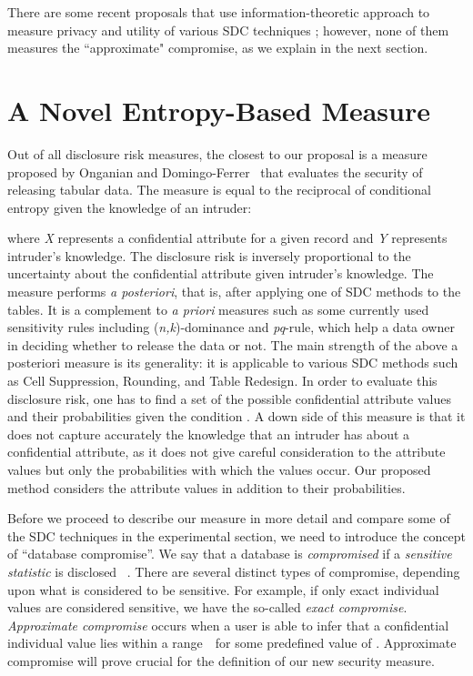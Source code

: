 \documentclass{llncs}
\begin{document}
There are some recent proposals that use information-theoretic approach
to measure privacy and utility of various SDC techniques
\cite{Oganian-Ferrer:Posteriori03,san:raj:poo}; however, none of them
measures the ``approximate" compromise, as we explain in the next section.

\section{A Novel Entropy-Based Measure}
Out of all disclosure risk measures, the closest to our proposal is a measure proposed by Onganian and Domingo-Ferrer~\cite{Oganian-Ferrer:Posteriori03} that evaluates the security of releasing
tabular data. The measure is equal to the reciprocal of
conditional entropy given the knowledge of an intruder:

where \emph{X} represents a confidential attribute for a given
record and \emph{Y} represents intruder's knowledge. The
disclosure risk is inversely proportional to the uncertainty about
the confidential attribute given intruder's knowledge. The measure
performs \emph{a posteriori}, that is, after applying one of SDC
methods to the tables. It is a complement to \emph{a priori}
measures such as some currently used sensitivity rules including
(\emph{n,k})-dominance and \emph{pq}-rule, which help a data owner
in deciding whether to release the data or not. The main strength
of the above a posteriori measure is its generality: it is
applicable to various SDC methods such as Cell Suppression,
Rounding, and Table Redesign. In order to evaluate this disclosure
risk, one has to find a set of the possible confidential attribute
values and their probabilities given the condition . A down
side of this measure is that it does not capture accurately the
knowledge that an intruder has about a confidential attribute, as
it does not give careful consideration to the attribute values but
only the probabilities with which the values occur. Our proposed
method considers the attribute values in addition to their
probabilities.

Before we proceed to describe our measure in more detail and compare some of
the SDC techniques in the experimental section, we need to
introduce the concept of ``database compromise''. We say that a
database is \emph{compromised} if a \emph{sensitive statistic} is
disclosed ~\cite{Denning:Cryptography82}. There are several
distinct types of compromise, depending upon what is considered to
be sensitive. For example, if only exact individual values are
considered sensitive, we have the so-called \emph{exact
compromise}.
 \emph{Approximate compromise} occurs when a user is
able to infer that a confidential individual value  lies within
a
range~~for
some predefined value of . Approximate
compromise will prove crucial for the definition of our new
security measure.
\end{document}

